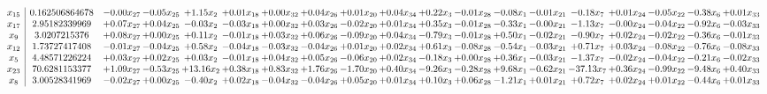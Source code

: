 \documentclass[9pt]{article}
\begin{document}
 \[\begin{array}{c| c c@{\hskip 2pt} c@{\hskip 2pt} c@{\hskip 2pt} c@{\hskip 2pt} c@{\hskip 2pt} c@{\hskip 2pt} c@{\hskip 2pt} c@{\hskip 2pt} c@{\hskip 2pt} c@{\hskip 2pt} c@{\hskip 2pt} c@{\hskip 2pt} c@{\hskip 2pt} c@{\hskip 2pt} c@{\hskip 2pt} c@{\hskip 2pt} c@{\hskip 2pt} }
 x_{15}   &  0.162506864678 & -0.00 x_{27} & -0.05 x_{25} & +  1.15 x_{2} & +  0.01 x_{18} & +  0.00 x_{32} & +  0.04 x_{26} & +  0.01 x_{20} & +  0.04 x_{34} & +  0.22 x_{3} & -0.01 x_{28} & -0.08 x_{1} & -0.01 x_{21} & -0.18 x_{7} & +  0.01 x_{24} & -0.05 x_{22} & -0.38 x_{6} & +  0.01 x_{33}\\
 x_{17}   &  2.95182339969 & +  0.07 x_{27} & +  0.04 x_{25} & -0.03 x_{2} & -0.03 x_{18} & +  0.00 x_{32} & +  0.03 x_{26} & -0.02 x_{20} & +  0.01 x_{34} & +  0.35 x_{3} & -0.01 x_{28} & -0.33 x_{1} & -0.00 x_{21} & -1.13 x_{7} & -0.00 x_{24} & -0.04 x_{22} & -0.92 x_{6} & -0.03 x_{33}\\
 x_{9}   &  3.0207215376 & +  0.08 x_{27} & +  0.00 x_{25} & +  0.11 x_{2} & -0.01 x_{18} & +  0.03 x_{32} & +  0.06 x_{26} & -0.09 x_{20} & +  0.04 x_{34} & -0.79 x_{3} & -0.01 x_{28} & +  0.50 x_{1} & -0.02 x_{21} & -0.90 x_{7} & +  0.02 x_{24} & -0.02 x_{22} & -0.36 x_{6} & -0.01 x_{33}\\
 x_{12}   &  1.73727417408 & -0.01 x_{27} & -0.04 x_{25} & +  0.58 x_{2} & -0.04 x_{18} & -0.03 x_{32} & -0.04 x_{26} & +  0.01 x_{20} & +  0.02 x_{34} & +  0.61 x_{3} & -0.08 x_{28} & -0.54 x_{1} & -0.03 x_{21} & +  0.71 x_{7} & +  0.03 x_{24} & -0.08 x_{22} & -0.76 x_{6} & -0.08 x_{33}\\
 x_{5}   &  4.48571226224 & +  0.03 x_{27} & +  0.02 x_{25} & +  0.03 x_{2} & -0.01 x_{18} & +  0.04 x_{32} & +  0.05 x_{26} & -0.06 x_{20} & +  0.02 x_{34} & -0.18 x_{3} & +  0.00 x_{28} & +  0.36 x_{1} & -0.03 x_{21} & -1.37 x_{7} & -0.02 x_{24} & -0.04 x_{22} & -0.21 x_{6} & -0.02 x_{33}\\
 x_{23}   &  70.6281153377 & +  1.09 x_{27} & -0.53 x_{25} & + 13.16 x_{2} & +  0.38 x_{18} & +  0.83 x_{32} & +  1.76 x_{26} & -1.70 x_{20} & +  0.40 x_{34} & -9.26 x_{3} & -0.28 x_{28} & +  9.68 x_{1} & -0.62 x_{21} & -37.13 x_{7} & +  0.36 x_{24} & -0.99 x_{22} & -9.48 x_{6} & +  0.40 x_{33}\\
 x_{8}   &  3.00528341969 & -0.02 x_{27} & +  0.00 x_{25} & -0.40 x_{2} & +  0.02 x_{18} & -0.04 x_{32} & -0.04 x_{26} & +  0.05 x_{20} & +  0.01 x_{34} & +  0.10 x_{3} & +  0.06 x_{28} & -1.21 x_{1} & +  0.01 x_{21} & +  0.72 x_{7} & +  0.02 x_{24} & +  0.01 x_{22} & -0.44 x_{6} & +  0.01 x_{33}\\

\end{array}\]
\end{document}
